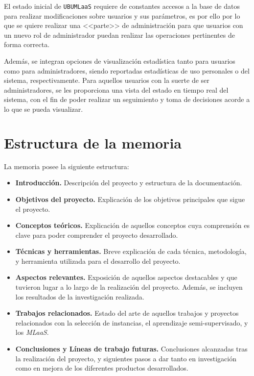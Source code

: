 El estado inicial de \texttt{UBUMLaaS} requiere de constantes accesos a la base de datos para realizar modificaciones sobre usuarios y sus parámetros, es por ello por lo que se quiere realizar una <<parte>> de administración para que usuarios con un nuevo rol de administrador puedan realizar las operaciones pertinentes de forma correcta.

Además, se integran opciones de visualización estadística tanto para usuarios como para administradores, siendo reportadas estadísticas de uso personales o del sistema, respectivamente. Para aquellos usuarios con la suerte de ser administradores, se les proporciona una vista del estado en tiempo real del sistema, con el fin de poder realizar un seguimiento y toma de decisiones acorde a lo que se pueda visualizar.

\section{Estructura de la memoria}\label{estructura-de-la-memoria}
La memoria posee la siguiente estructura:
\begin{itemize}
\item \textbf{Introducción.} Descripción del proyecto y estructura de la documentación.
\item \textbf{Objetivos del proyecto.} Explicación de los objetivos principales que sigue el proyecto.
\item \textbf{Conceptos teóricos.} Explicación de aquellos conceptos cuya comprensión es clave para poder comprender el proyecto desarrollado.
\item \textbf{Técnicas y herramientas.} Breve explicación de cada técnica, metodología, y herramienta utilizada para el desarrollo del proyecto.
\item \textbf{Aspectos relevantes.} Exposición de aquellos aspectos destacables y que tuvieron lugar a lo largo de la realización del proyecto. Además, se incluyen los resultados de la investigación realizada.
\item \textbf{Trabajos relacionados.} Estado del arte de aquellos trabajos y proyectos relacionados con la selección de instancias, el aprendizaje semi-supervisado, y los \textit{MLaaS}.
\item \textbf{Conclusiones y Líneas de trabajo futuras.} Conclusiones alcanzadas tras la realización del proyecto, y siguientes pasos a dar tanto en investigación como en mejora de los diferentes productos desarrollados.
\end{itemize}

